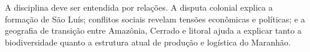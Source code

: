 \begin{resumo}
A disciplina deve ser entendida por relações. A disputa colonial explica a formação de São Luís; conflitos sociais revelam tensões econômicas e políticas; e a geografia de transição entre Amazônia, Cerrado e litoral ajuda a explicar tanto a biodiversidade quanto a estrutura atual de produção e logística do Maranhão.
\end{resumo}
